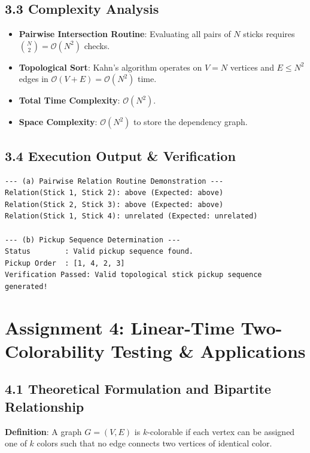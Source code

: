 \documentclass[12pt]{article}
\begin{document}
\subsection*{3.3 Complexity Analysis}
\begin{itemize}
    \item \textbf{Pairwise Intersection Routine}: Evaluating all pairs of $N$ sticks requires $\binom{N}{2} = \mathcal{O}(N^2)$ checks.
    \item \textbf{Topological Sort}: Kahn's algorithm operates on $V = N$ vertices and $E \le N^2$ edges in $\mathcal{O}(V + E) = \mathcal{O}(N^2)$ time.
    \item \textbf{Total Time Complexity}: $\mathcal{O}(N^2)$.
    \item \textbf{Space Complexity}: $\mathcal{O}(N^2)$ to store the dependency graph.
\end{itemize}

\subsection*{3.4 Execution Output \& Verification}
\begin{lstlisting}
--- (a) Pairwise Relation Routine Demonstration ---
Relation(Stick 1, Stick 2): above (Expected: above)
Relation(Stick 2, Stick 3): above (Expected: above)
Relation(Stick 1, Stick 4): unrelated (Expected: unrelated)

--- (b) Pickup Sequence Determination ---
Status        : Valid pickup sequence found.
Pickup Order  : [1, 4, 2, 3]
Verification Passed: Valid topological stick pickup sequence generated!
\end{lstlisting}

\newpage

\section*{Assignment 4: Linear-Time Two-Colorability Testing \& Applications}

\subsection*{4.1 Theoretical Formulation and Bipartite Relationship}
\textbf{Definition}: A graph $G = (V, E)$ is $k$-colorable if each vertex can be assigned one of $k$ colors such that no edge connects two vertices of identical color.
\end{document}

